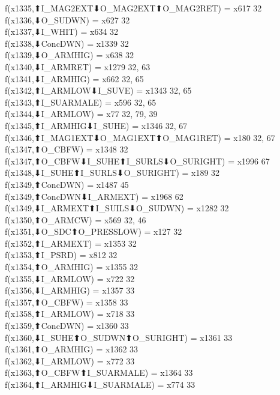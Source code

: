 f(x1335,⬆I_MAG2EXT⬇O_MAG2EXT⬆O_MAG2RET) = x617 {32} \\
f(x1336,⬇O_SUDWN) = x627 {32} \\
f(x1337,⬇I_WHIT) = x634 {32} \\
f(x1338,⬇ConcDWN) = x1339 {32} \\
f(x1339,⬇O_ARMHIG) = x638 {32} \\
f(x1340,⬇I_ARMRET) = x1279 {32, 63} \\
f(x1341,⬇I_ARMHIG) = x662 {32, 65} \\
f(x1342,⬆I_ARMLOW⬇I_SUVE) = x1343 {32, 65} \\
f(x1343,⬆I_SUARMALE) = x596 {32, 65} \\
f(x1344,⬇I_ARMLOW) = x77 {32, 79, 39} \\
f(x1345,⬆I_ARMHIG⬇I_SUHE) = x1346 {32, 67} \\
f(x1346,⬆I_MAG1EXT⬇O_MAG1EXT⬆O_MAG1RET) = x180 {32, 67} \\
f(x1347,⬆O_CBFW) = x1348 {32} \\
f(x1347,⬆O_CBFW⬇I_SUHE⬆I_SURLS⬇O_SURIGHT) = x1996 {67} \\
f(x1348,⬇I_SUHE⬆I_SURLS⬇O_SURIGHT) = x189 {32} \\
f(x1349,⬆ConcDWN) = x1487 {45} \\
f(x1349,⬆ConcDWN⬇I_ARMEXT) = x1968 {62} \\
f(x1349,⬇I_ARMEXT⬆I_SUILS⬇O_SUDWN) = x1282 {32} \\
f(x1350,⬆O_ARMCW) = x569 {32, 46} \\
f(x1351,⬇O_SDC⬆O_PRESSLOW) = x127 {32} \\
f(x1352,⬆I_ARMEXT) = x1353 {32} \\
f(x1353,⬆I_PSRD) = x812 {32} \\
f(x1354,⬆O_ARMHIG) = x1355 {32} \\
f(x1355,⬇I_ARMLOW) = x722 {32} \\
f(x1356,⬇I_ARMHIG) = x1357 {33} \\
f(x1357,⬆O_CBFW) = x1358 {33} \\
f(x1358,⬆I_ARMLOW) = x718 {33} \\
f(x1359,⬆ConcDWN) = x1360 {33} \\
f(x1360,⬇I_SUHE⬆O_SUDWN⬆O_SURIGHT) = x1361 {33} \\
f(x1361,⬆O_ARMHIG) = x1362 {33} \\
f(x1362,⬇I_ARMLOW) = x772 {33} \\
f(x1363,⬆O_CBFW⬆I_SUARMALE) = x1364 {33} \\
f(x1364,⬆I_ARMHIG⬇I_SUARMALE) = x774 {33} \\

